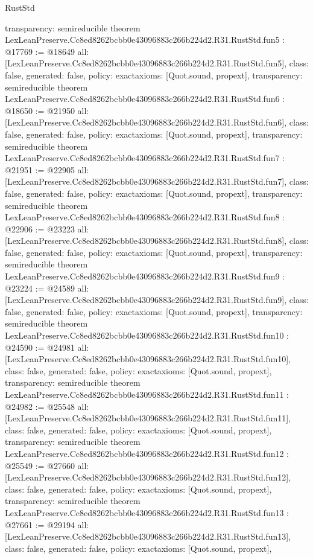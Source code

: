 \begin{lexlean}{RustStd}
\begin{coremodule}
{  transparency: semireducible
}
theorem LexLeanPreserve.Cc8ed8262bcbb0e43096883c266b224d2.R31.RustStd.fun5 : @17769 := @18649 {
  all: [LexLeanPreserve.Cc8ed8262bcbb0e43096883c266b224d2.R31.RustStd.fun5],
  class: false,
  generated: false,
  policy: exact{axioms: [Quot.sound, propext]},
  transparency: semireducible
}
theorem LexLeanPreserve.Cc8ed8262bcbb0e43096883c266b224d2.R31.RustStd.fun6 : @18650 := @21950 {
  all: [LexLeanPreserve.Cc8ed8262bcbb0e43096883c266b224d2.R31.RustStd.fun6],
  class: false,
  generated: false,
  policy: exact{axioms: [Quot.sound, propext]},
  transparency: semireducible
}
theorem LexLeanPreserve.Cc8ed8262bcbb0e43096883c266b224d2.R31.RustStd.fun7 : @21951 := @22905 {
  all: [LexLeanPreserve.Cc8ed8262bcbb0e43096883c266b224d2.R31.RustStd.fun7],
  class: false,
  generated: false,
  policy: exact{axioms: [Quot.sound, propext]},
  transparency: semireducible
}
theorem LexLeanPreserve.Cc8ed8262bcbb0e43096883c266b224d2.R31.RustStd.fun8 : @22906 := @23223 {
  all: [LexLeanPreserve.Cc8ed8262bcbb0e43096883c266b224d2.R31.RustStd.fun8],
  class: false,
  generated: false,
  policy: exact{axioms: [Quot.sound, propext]},
  transparency: semireducible
}
theorem LexLeanPreserve.Cc8ed8262bcbb0e43096883c266b224d2.R31.RustStd.fun9 : @23224 := @24589 {
  all: [LexLeanPreserve.Cc8ed8262bcbb0e43096883c266b224d2.R31.RustStd.fun9],
  class: false,
  generated: false,
  policy: exact{axioms: [Quot.sound, propext]},
  transparency: semireducible
}
theorem LexLeanPreserve.Cc8ed8262bcbb0e43096883c266b224d2.R31.RustStd.fun10 : @24590 := @24981 {
  all: [LexLeanPreserve.Cc8ed8262bcbb0e43096883c266b224d2.R31.RustStd.fun10],
  class: false,
  generated: false,
  policy: exact{axioms: [Quot.sound, propext]},
  transparency: semireducible
}
theorem LexLeanPreserve.Cc8ed8262bcbb0e43096883c266b224d2.R31.RustStd.fun11 : @24982 := @25548 {
  all: [LexLeanPreserve.Cc8ed8262bcbb0e43096883c266b224d2.R31.RustStd.fun11],
  class: false,
  generated: false,
  policy: exact{axioms: [Quot.sound, propext]},
  transparency: semireducible
}
theorem LexLeanPreserve.Cc8ed8262bcbb0e43096883c266b224d2.R31.RustStd.fun12 : @25549 := @27660 {
  all: [LexLeanPreserve.Cc8ed8262bcbb0e43096883c266b224d2.R31.RustStd.fun12],
  class: false,
  generated: false,
  policy: exact{axioms: [Quot.sound, propext]},
  transparency: semireducible
}
theorem LexLeanPreserve.Cc8ed8262bcbb0e43096883c266b224d2.R31.RustStd.fun13 : @27661 := @29194 {
  all: [LexLeanPreserve.Cc8ed8262bcbb0e43096883c266b224d2.R31.RustStd.fun13],
  class: false,
  generated: false,
  policy: exact{axioms: [Quot.sound, propext]},
}
\end{coremodule}
\end{lexlean}
